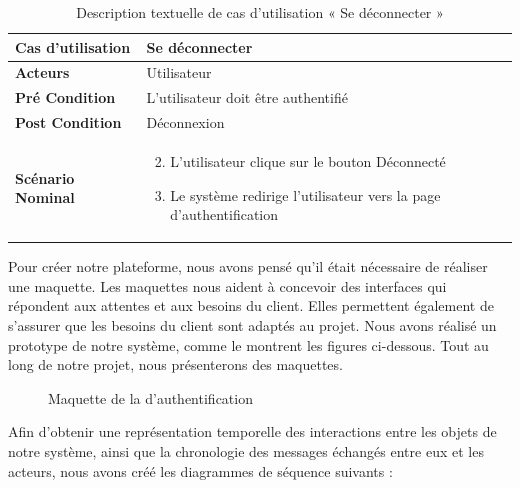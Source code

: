 
\begin{longtable}{|p{5cm}|p{10cm}|}
  \caption{Description textuelle de cas d'utilisation « Se déconnecter »} \label{tab:use_case_logout}\\
\hline
\textbf{Cas d'utilisation}&Se déconnecter\\
\hline
\textbf{Acteurs}&Utilisateur \\
\hline
\textbf{Pré Condition}&L'utilisateur doit être authentifié\\
\hline
\textbf{Post Condition}&Déconnexion\\
\hline
\textbf{Scénario Nominal}&
\vspace{-\baselineskip}
\begin{enumerate}
    \setcounter{enumi}{1}
    \item L'utilisateur clique sur le bouton Déconnecté
    \item Le système redirige l'utilisateur vers la page d'authentification

\end{enumerate}\\
\hline

\end{longtable}

Pour créer notre plateforme, nous avons pensé qu'il était nécessaire de réaliser une maquette. Les maquettes nous aident à concevoir des interfaces qui répondent aux attentes et aux besoins du client. Elles permettent également de s'assurer que les besoins du client sont adaptés au projet. Nous avons réalisé un prototype de notre système, comme le montrent les figures ci-dessous. Tout au long de notre projet, nous présenterons des maquettes.

\begin{figure}[H]
  \centering
  \caption{Maquette de la d'authentification}
  \label{fig:design_auth}
\end{figure}


Afin d'obtenir une représentation temporelle des interactions entre les objets de notre système, ainsi que la chronologie des messages échangés entre eux et les acteurs, nous avons créé les diagrammes de séquence suivants :

